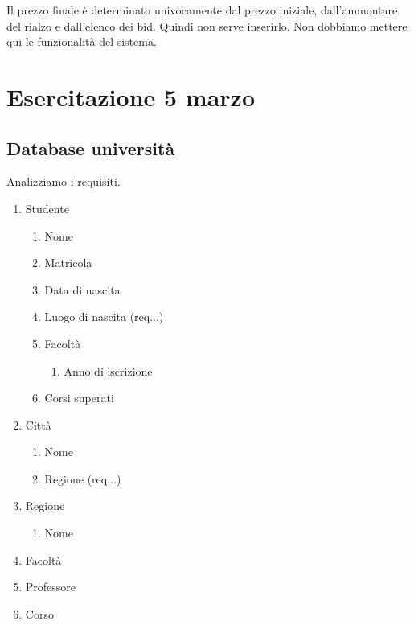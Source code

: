 Il prezzo finale \`e determinato univocamente dal prezzo iniziale, dall'ammontare del rialzo e dall'elenco dei bid. Quindi non serve inserirlo. Non dobbiamo mettere qui le funzionalit\`a del sistema.

\section{Esercitazione 5 marzo}

\subsection{Database universit\`a}

Analizziamo i requisiti.
\begin{enumerate}
    \item Studente
    \begin{enumerate}
        \item Nome
        \item Matricola
        \item Data di nascita
        \item Luogo di nascita (req...)
        \item Facolt\`a
        \begin{enumerate}
            \item Anno di iscrizione
        \end{enumerate}
        \item Corsi superati
    \end{enumerate}
    \item Citt\`a
    \begin{enumerate}
        \item Nome
        \item Regione (req...)
    \end{enumerate}
    \item Regione
    \begin{enumerate}
        \item Nome
    \end{enumerate}
    \item Facolt\`a
    \item Professore
    \item Corso
\end{enumerate}

